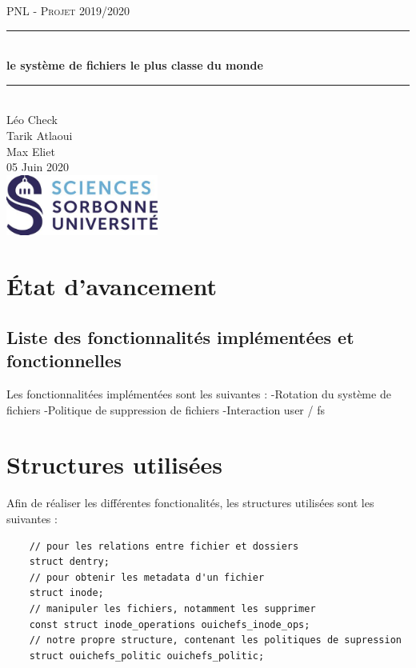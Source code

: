 \documentclass{article}
\date{\today}
\author{Léo Check\\ Tarik Atlaoui \\ Max Eliet}
\begin{document}
\begin{titlepage}
	\enlargethispage{2cm}
	\newcommand{\HRule}{\rule{\linewidth}{0.5mm}}
	\center
	\textsc{\LARGE
	PNL - Projet 2019/2020 
	} \\[1cm]
	\HRule \\[0.4cm]
	{ \huge \bfseries le système de fichiers le plus classe du monde \\[0.15cm] }
	\HRule \\[4cm]
	\large{Léo Check \\[3mm] Tarik Atlaoui \\[3mm] Max Eliet} \\[3cm]
	05 Juin 2020 \\[3cm]
	\hfill \includegraphics[width=5cm]{logoSU.jpg}
\end{titlepage}

	\newpage
	\section{État d'avancement}
	\subsection{Liste des fonctionnalités implémentées et fonctionnelles}
	Les fonctionnalitées implémentées sont les suivantes :
	\newline	
	-Rotation du système de fichiers
	\newline
	-Politique de suppression de fichiers
	\newline
	-Interaction user / fs
	\section{Structures utilisées}
	Afin de réaliser les différentes fonctionalités, les structures utilisées sont les suivantes :
	\begin{lstlisting}
	// pour les relations entre fichier et dossiers
	struct dentry;
	// pour obtenir les metadata d'un fichier
	struct inode;
	// manipuler les fichiers, notamment les supprimer
	const struct inode_operations ouichefs_inode_ops;
	// notre propre structure, contenant les politiques de supression
	struct ouichefs_politic ouichefs_politic;
	\end{lstlisting}
\end{document}
